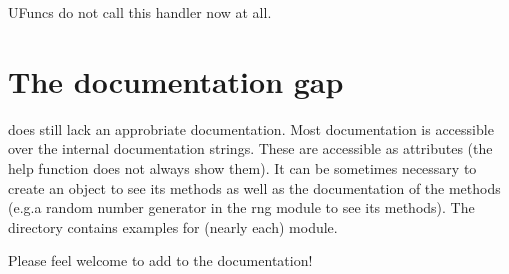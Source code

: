 UFuncs do not call this handler now at all.


\section{The documentation gap}

\pygsl{} does still lack an approbriate documentation. Most documentation is accessible over
the internal documentation strings. These are accessible as  attributes (the help
function does not always show them).  It can be sometimes necessary to create an 
object to see its methods as well as the documentation of the methods
 (e.g.a random number generator in the rng module to see its methods). 
The  directory contains examples for (nearly each) module.

Please feel welcome to add to the documentation!

